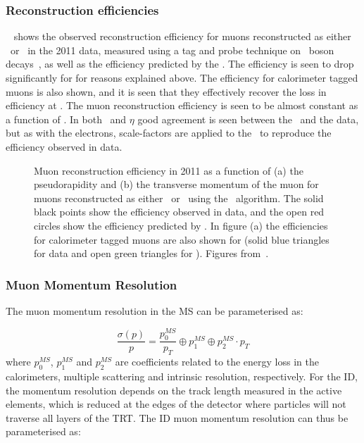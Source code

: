 \subsubsection{Reconstruction efficiencies}

~ shows the observed reconstruction efficiency for muons
reconstructed as either \combined\ or \segmentTagged\ in the 2011 data, measured
using a tag and probe technique on \Z\ boson decays~\cite{ATLAS-CONF-2011-063},
as well as the efficiency predicted by the \mcsim. The
efficiency is seen to drop significantly for  for reasons
explained above. The efficiency for calorimeter tagged muons is also shown, and
it is seen that they effectively recover the loss in efficiency at
. The muon reconstruction efficiency is seen to be almost constant
as a function of \pt. In both \pt\ and $\eta$ good agreement is seen between the
\mcsim\ and the data, but as with the electrons, scale-factors are applied to
the \mc\ to reproduce the efficiency observed in data.

\begin{figure}[h]
\centering
    \caption[Muon reconstruction efficiency in 2011 as a function of the
    pseudorapidity and the transverse momentum of the muon.]{Muon
    reconstruction efficiency in 2011 as a function of (a) the pseudorapidity and
    (b) the transverse momentum of the muon for muons reconstructed as either
    \combined\ or \segmentTagged\ using the \staco\ algorithm. The solid black points
    show the efficiency observed in data, and the open red circles show the
    efficiency predicted by \mcsim. In figure (a) the efficiencies
    for calorimeter tagged muons are also shown for  (solid blue
    triangles for data and open green triangles for \mc). Figures
    from~\cite{MuonEfficiency2011}.} 
    \label{fig:mu-reco-eff} 
\end{figure}


\subsubsection{Muon Momentum Resolution}

The muon momentum resolution in the MS can be parameterised as:

\begin{equation}
\frac{ \sigma (p) }{ p } = \frac{ p_{0}^{MS} }{ p_{T} } \oplus  p_{1}^{MS}
\oplus  p_{2}^{MS} \cdot p_{T}
\end{equation}
where $p_{0}^{MS}$, $p_{1}^{MS}$ and $p_{2}^{MS}$ are coefficients related to
the energy loss in the calorimeters, multiple scattering and intrinsic
resolution, respectively. For the ID, the momentum resolution depends on the
track length measured in the active elements, which is reduced at the edges of
the detector where particles will not traverse all layers of the TRT. The ID
muon momentum resolution can thus be parameterised as:


